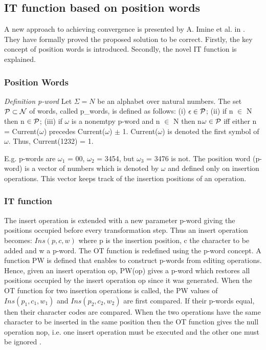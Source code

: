 \subsection{IT function based on position words}
\label{otf:imor}

A new approach to achieving convergence is presented by A. Imine et al. in \cite{imine04}. They have formally proved the proposed solution to be correct. Firstly, the key concept of position words is introduced. Secondly, the novel IT function is explained.

\subsubsection{Position Words}
\emph{Definition p-word} Let $\Sigma = N$ be an alphabet over natural numbers. The set $\cal P \subset N$ of words, called p_words, is defined as follows: (i) $\epsilon \in \cal P$; (ii) if n $\in$ N then n $\in \cal P$; (iii) if $\omega$ is a nonemtpy p-word and n $\in$ N then n$\omega \in \cal P$ iff either n = Current($\omega$) precedes Current($\omega$) $\pm$ 1. Current($\omega$) is denoted the first symbol of $\omega$. Thus, Current(1232) = 1.

E.g. p-words are $\omega_{1}$ = 00, $\omega_{2}$ = 3454, but $\omega_{3}$ = 3476 is not. 
The position word (p-word) is a vector of numbers which is denoted by $\omega$ and defined only on insertion operations. This vector keeps track of the insertion positions of an operation.

\subsubsection{IT function}
The insert operation is extended with a new parameter p-word giving the positions occupied before every transformation step. Thus an insert operation becomes: $Ins(p,c,w)$ where p is the insertion position, c the character to be added and w a p-word.
The OT function is redefined using the p-word concept. A function PW is defined that enables to construct p-words from editing operations. Hence, given an insert operation op, PW(op) gives a p-word which restores all positions occupied by the insert operation op since it was generated. 
When the OT function for two insertion operations is called, the PW values of $Ins(p_1,c_1,w_1)$ and $Ins(p_2,c_2,w_2)$ are first compared. If their p-words equal, then their character codes are compared. When the two operations have the same character to be inserted in the same position then the OT function gives the null operation nop, i.e. one insert operation must be executed and the other one must be ignored \cite{suleiman98}.

